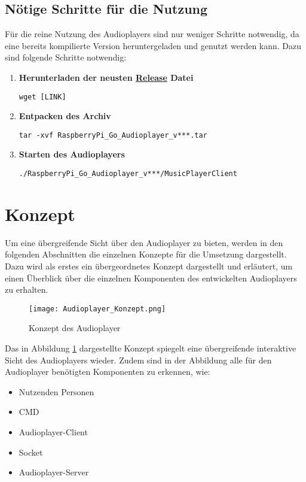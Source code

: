 \subsection{Nötige Schritte für die Nutzung}
Für die reine Nutzung des Audioplayers sind nur weniger Schritte notwendig,
da eine bereits kompilierte Version heruntergeladen und genutzt werden kann.
Dazu sind folgende Schritte notwendig:
\begin{enumerate}
\item \textbf{Herunterladen der neusten \href{https://github.com/alexanderklapdor/RaspberryPi_Go_Audioplayer/releases}{Release} Datei}  \\
\begin{lstlisting}[caption={Herunterladen einer Datei}]
wget [LINK]
\end{lstlisting}

\item \textbf{Entpacken des Archiv} \\
\begin{lstlisting}[caption={Entpacken eines Archivs}]
tar -xvf RaspberryPi_Go_Audioplayer_v***.tar
\end{lstlisting}

\item \textbf{Starten des Audioplayers} \\
\begin{lstlisting}[caption={Starten des Audioplayers}]
./RaspberryPi_Go_Audioplayer_v***/MusicPlayerClient
\end{lstlisting}
\end{enumerate}

\section{Konzept}
Um eine übergreifende Sicht über den Audioplayer zu bieten, werden in den
folgenden Abschnitten die einzelnen Konzepte für die Umsetzung dargestellt.
Dazu wird als erstes ein übergeordnetes Konzept dargestellt und erläutert,
um einen Überblick über die einzelnen Komponenten des entwickelten Audioplayers
zu erhalten.

\begin{figure}[h]
	\centering
	\texttt{[image: Audioplayer\_Konzept.png]}
	\caption{Konzept des Audioplayer}
	\label{img:Konzept-Audioplayer}
\end{figure}

Das in Abbildung \ref{img:Konzept-Audioplayer} dargestellte Konzept spiegelt
eine übergreifende interaktive Sicht des Audioplayers wieder. Zudem sind in der
Abbildung alle für den Audioplayer benötigten Komponenten zu erkennen, wie:
\begin{itemize}
\item Nutzenden Personen
\item \ac{CMD}
\item Audioplayer-Client
\item Socket
\item Audioplayer-Server
\end{itemize}

